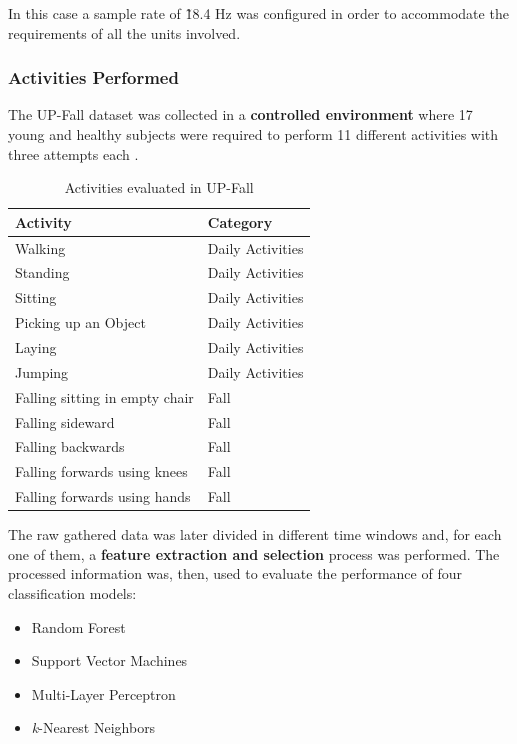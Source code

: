 In this case a sample rate of \~ 18.4 Hz was configured in order to accommodate the requirements of all the units involved.

\subsubsection{Activities Performed}\label{subsubsec:upfall-activities}

The UP-Fall dataset was collected in a \textbf{controlled environment} where 17 young and healthy subjects were required to perform 11 different activities with three attempts each \cite{upfall}.

\begin{table}[H]
\centering
\begin{tabular}{ll}
    \hline
    Activity                          &   Category           \\
    \hline
    Walking                           &   Daily Activities   \\
    Standing                          &   Daily Activities   \\
    Sitting                           &   Daily Activities   \\
    Picking up an Object              &   Daily Activities   \\
    Laying                            &   Daily Activities   \\
    Jumping                           &   Daily Activities   \\
    Falling sitting in empty chair    &   Fall               \\
    Falling sideward                  &   Fall               \\
    Falling backwards                 &   Fall               \\
    Falling forwards using knees      &   Fall               \\
    Falling forwards using hands      &   Fall               \\
    \hline
\end{tabular}
\caption{Activities evaluated in UP-Fall}
\label{toc:umafall2}
\end{table}

The raw gathered data was later divided in different time windows and, for each one of them, a \textbf{feature extraction and selection} process was performed. The processed information was, then, used to evaluate the performance of four classification models: 

\begin{itemize}
    \item Random Forest
    \item Support Vector Machines
    \item Multi-Layer Perceptron
    \item \textit{k}-Nearest Neighbors
\end{itemize}

